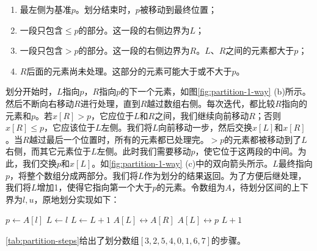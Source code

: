 \documentclass[b5paper]{ctexart}
\begin{document}
\begin{enumerate}
\item 最左侧为基准$p$。划分结束时，$p$被移动到最终位置；
\item 一段只包含$\leq p$的部分。这一段的右侧边界为$L$；
\item 一段只包含$> p$的部分。这一段的右侧边界为$R$。$L$、$R$之间的元素都大于$p$；
\item $R$后面的元素尚未处理。这部分的元素可能大于或不大于$p$。
\end{enumerate}

划分开始时，$L$指向$p$，$R$指向$p$的下一个元素，如图\cref{fig:partition-1-way} (b)所示。然后不断向右移动$R$进行处理，直到$R$越过数组右侧。每次迭代，都比较$R$指向的元素和$p$。若$x[R] > p$，它应位于$L$和$R$之间，我们继续向前移动$R$；否则$x[R] \leq p$，它应该位于$L$左侧。我们将$L$向前移动一步，然后交换$x[L]$和$x[R]$。当$R$越过最后一个位置时，所有的元素都已处理完。$> p$的元素都被移动到了$L$右侧，而其它元素位于$L$左侧。此时我们需要移动$p$，使它位于这两段的中间。为此，我们交换$p$和$x[L]$。如\cref{fig:partition-1-way} (c)中的双向箭头所示。$L$最终指向$p$，将整个数组分成两部分。我们将$L$作为划分的结果返回。为了方便后继处理，我们将$L$增加1，使得它指向第一个大于$p$的元素。令数组为$A$，待划分区间的上下界为$l, u$，原地划分实现如下：

\begin{algorithmic}[1]
  \State $p \gets A[l]$  
  \State $L \gets l$ 
   
      \State $L \gets L + 1$
      \State {} $A[L] \leftrightarrow A[R]$
    \EndIf
  \EndFor
  \State {} $A[L] \leftrightarrow p$
  \State \Return $L + 1$ 
\EndFunction
\end{algorithmic}

\cref{tab:partition-steps}给出了划分数组$[3, 2, 5, 4, 0, 1, 6, 7]$的步骤。
\end{document}
